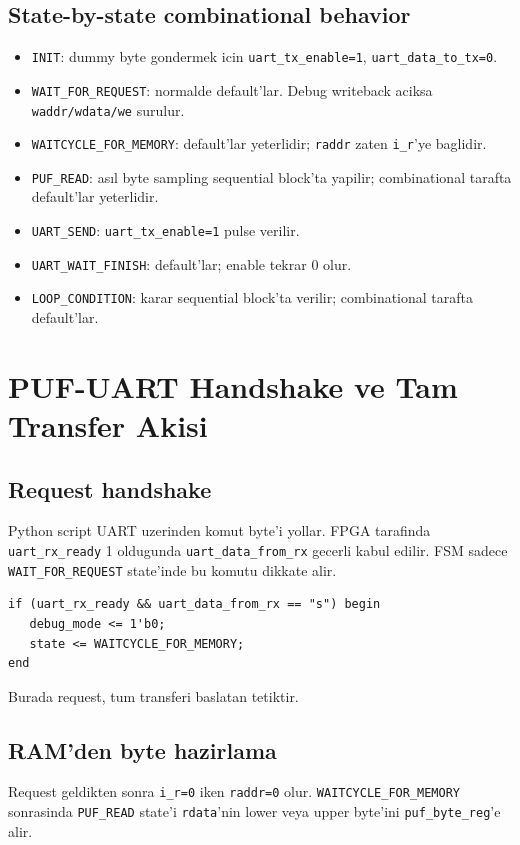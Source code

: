 \documentclass[11pt,a4paper]{article}
\begin{document}
\subsection{State-by-state combinational behavior}
\begin{itemize}
  \item \texttt{INIT}: dummy byte gondermek icin \texttt{uart\_tx\_enable=1}, \texttt{uart\_data\_to\_tx=0}.
  \item \texttt{WAIT\_FOR\_REQUEST}: normalde default'lar. Debug writeback aciksa \texttt{waddr/wdata/we} surulur.
  \item \texttt{WAITCYCLE\_FOR\_MEMORY}: default'lar yeterlidir; \texttt{raddr} zaten \texttt{i\_r}'ye baglidir.
  \item \texttt{PUF\_READ}: asıl byte sampling sequential block'ta yapilir; combinational tarafta default'lar yeterlidir.
  \item \texttt{UART\_SEND}: \texttt{uart\_tx\_enable=1} pulse verilir.
  \item \texttt{UART\_WAIT\_FINISH}: default'lar; enable tekrar 0 olur.
  \item \texttt{LOOP\_CONDITION}: karar sequential block'ta verilir; combinational tarafta default'lar.
\end{itemize}

\section{PUF-UART Handshake ve Tam Transfer Akisi}

\subsection{Request handshake}
Python script UART uzerinden komut byte'i yollar. FPGA tarafinda \texttt{uart\_rx\_ready} 1 oldugunda \texttt{uart\_data\_from\_rx} gecerli kabul edilir. FSM sadece \texttt{WAIT\_FOR\_REQUEST} state'inde bu komutu dikkate alir.

\begin{lstlisting}[style=verilogstyle]
if (uart_rx_ready && uart_data_from_rx == "s") begin
   debug_mode <= 1'b0;
   state <= WAITCYCLE_FOR_MEMORY;
end
\end{lstlisting}

Burada request, tum transferi baslatan tetiktir.

\subsection{RAM'den byte hazirlama}
Request geldikten sonra \texttt{i\_r=0} iken \texttt{raddr=0} olur. \texttt{WAITCYCLE\_FOR\_MEMORY} sonrasinda \texttt{PUF\_READ} state'i \texttt{rdata}'nin lower veya upper byte'ini \texttt{puf\_byte\_reg}'e alir.
\end{document}
